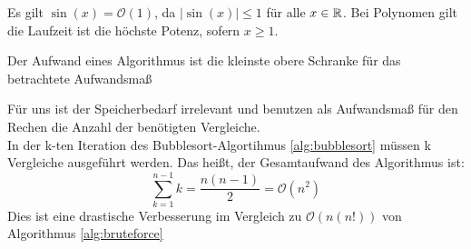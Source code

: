 \begin{example}
Es gilt $\sin(x) = \mathcal{O}(1)$, da $|\sin(x)|\le 1$ für alle $x \in  \mathbb{R}$. Bei Polynomen gilt die Laufzeit ist die höchste Potenz, sofern $ x\ge 1$.
\end{example}
\begin{definition}
Der Aufwand eines Algorithmus ist die kleinste obere Schranke für das betrachtete Aufwandsmaß
\end{definition}
Für uns ist der Speicherbedarf irrelevant und benutzen als Aufwandsmaß für den Rechen die Anzahl der benötigten Vergleiche. \\
In der k-ten Iteration des Bubblesort-Algortihmus \ref{alg:bubblesort} müssen k Vergleiche ausgeführt werden. Das heißt, der Gesamtaufwand des Algorithmus ist:
\[
\sum_{k=1}^{n-1}k=\frac{n(n-1)}{2}= \mathcal{O}(n^2)
\]
Dies ist eine drastische Verbesserung im Vergleich zu $\mathcal{O}(n(n!))$ von Algorithmus \ref{alg:bruteforce}

